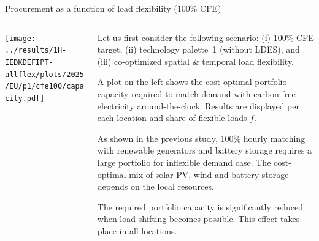 \begin{frame}{Procurement as a function of load flexibility (100\% CFE)}
\label{sec:procurement}

  {\footnotesize
  \vspace{0.2cm}
  
  \begin{columns}[T]
  \begin{column}{9cm}
  \centering
  
  \texttt{[image: ../results/1H-IEDKDEFIPT-allflex/plots/2025/EU/p1/cfe100/capacity.pdf]}

  \end{column}

  \begin{column}{6cm}
  
  Let us first consider the following scenario:
  (i) 100\% CFE target, (ii) technology palette~1 (without LDES), and (iii)  co-optimized spatial \& temporal load flexibility.
  
  \vspace{0.1cm}
  A plot on the left shows the cost-optimal \alert{portfolio capacity} required to match demand with carbon-free electricity around-the-clock. Results are displayed per each location and share of flexible loads $f$.
  
  \vspace{0.1cm}
  As shown in the previous study, 100\% hourly matching with renewable generators and battery storage requires a large portfolio for inflexible demand case. The cost-optimal mix of solar PV, wind and battery storage depends on the local resources.

  \vspace{0.1cm}
  The required portfolio capacity \alert{is significantly reduced when load shifting becomes possible}. This effect takes place in all locations.
  \end{column}
  \end{columns}
  }
\end{frame}


